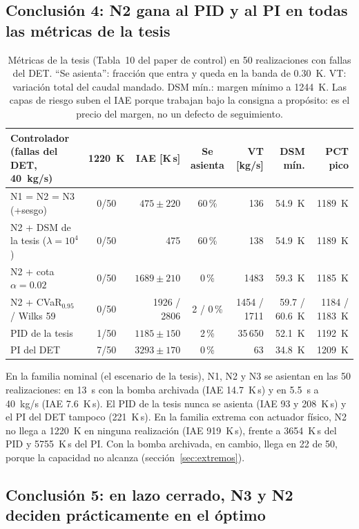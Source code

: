 \subsection{Conclusión 4: N2 gana al PID y al PI en todas las métricas de la tesis}

\begin{table}[H]\centering\small
\begin{tabularx}{\linewidth}{@{}Y c r c r r r@{}}\toprule
Controlador (fallas del DET, 40~kg/s) & 1220~K & IAE [K\,s] & Se asienta & VT [kg/s] & DSM mín. & PCT pico\\\midrule
N1 = N2 = N3 (+sesgo) & 0/50 & $475\pm220$ & 60\,\% & 136 & 54.9~K & 1189~K\\
N2 + DSM de la tesis ($\lambda=10^4$) & 0/50 & 475 & 60\,\% & 138 & 54.9~K & 1189~K\\
N2 + cota $\alpha=0.02$ & 0/50 & $1689\pm210$ & 0\,\% & 1483 & 59.3~K & 1185~K\\
N2 + CVaR$_{0.95}$ / Wilks 59 & 0/50 & 1926 / 2806 & 2 / 0\,\% & 1454 / 1711 & 59.7 / 60.6~K & 1184 / 1183~K\\
PID de la tesis & 1/50 & $1185\pm150$ & 2\,\% & 35\,650 & 52.1~K & 1192~K\\
PI del DET & 7/50 & $3293\pm170$ & 0\,\% & 63 & 34.8~K & 1209~K\\\bottomrule
\end{tabularx}
\caption{Métricas de la tesis (Tabla~10 del paper de control) en 50 realizaciones con fallas
del DET. ``Se asienta'': fracción que entra y queda en la banda de 0.30~K. VT: variación total
del caudal mandado. DSM mín.: margen mínimo a 1244~K. Las capas de riesgo suben el IAE porque
trabajan bajo la consigna a propósito: es el precio del margen, no un defecto de seguimiento.}
\end{table}

En la familia nominal (el escenario de la tesis), N1, N2 y N3 se asientan en las 50
realizaciones: en 13~s con la bomba archivada (IAE 14.7~K\,s) y en 5.5~s a 40~kg/s (IAE
7.6~K\,s). El PID de la tesis nunca se asienta (IAE 93 y 208~K\,s) y el PI del DET tampoco (221~K\,s).
En la familia extrema con actuador físico, N2 no llega a 1220~K en ninguna realización (IAE
919~K\,s), frente a 3654~K\,s del PID y 5755~K\,s del PI. Con la bomba archivada, en cambio, llega
en 22 de 50, porque la capacidad no alcanza (sección~\ref{sec:extremos}).

\subsection{Conclusión 5: en lazo cerrado, N3 y N2 deciden prácticamente en el óptimo}

